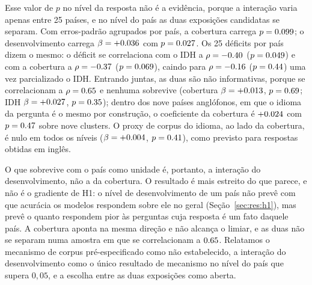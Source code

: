 Esse valor de $p$ no nível da resposta não é a evidência, porque a interação
varia apenas entre 25 países, e no nível do país as duas exposições candidatas
se separam. Com erros-padrão agrupados por país, a cobertura carrega
$p=0.099$; o desenvolvimento carrega $\beta=+0.036$ com
$p=0.027$. Os 25 déficits por país dizem o mesmo: o déficit se
correlaciona com o IDH a $\rho=-0.40$ ($p=0.049$) e com a
cobertura a $\rho=-0.37$ ($p=0.069$), caindo para
$\rho=-0.16$ ($p=0.44$) uma vez parcializado o IDH.
Entrando juntas, as duas são não informativas, porque se correlacionam a
$\rho=0.65$ e nenhuma sobrevive (cobertura $\beta=+0.013$,
$p=0.69$; IDH $\beta=+0.027$, $p=0.35$); dentro dos
nove países anglófonos, em que o idioma da pergunta é o mesmo por construção, o
coeficiente da cobertura é $+0.024$ com $p=0.47$ sobre nove
clusters. O proxy de corpus do idioma, ao lado da cobertura, é nulo em todos os
níveis ($\beta=+0.004$, $p=0.41$), como previsto para respostas
obtidas em inglês.

O que sobrevive com o país como unidade é, portanto, a interação do
desenvolvimento, não a da cobertura. O resultado é mais estreito do que parece,
e não é o gradiente de H1: o nível de desenvolvimento de um país não prevê com
que acurácia os modelos respondem sobre ele no geral (Seção~\ref{sec:res:h1}),
mas prevê o quanto respondem pior às perguntas cuja resposta é um fato daquele
país. A cobertura aponta na mesma direção e não alcança o limiar, e as duas não
se separam numa amostra em que se correlacionam a $0.65$. Relatamos o
mecanismo de corpus pré-especificado como não estabelecido, a interação do
desenvolvimento como o único resultado de mecanismo no nível do país que supera
$0{,}05$, e a escolha entre as duas exposições como aberta.

